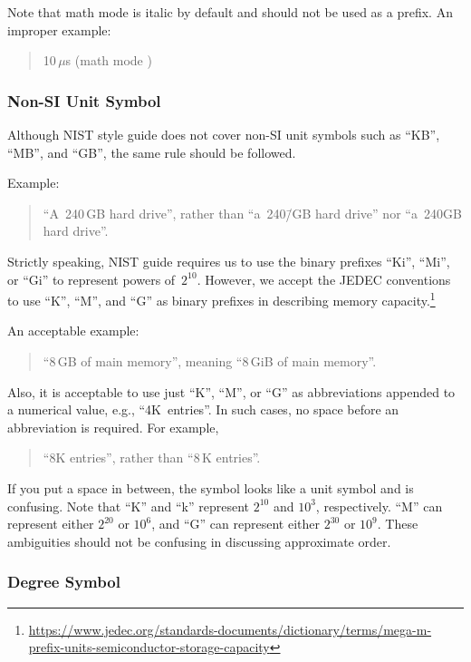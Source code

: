 Note that math mode \qco{\\mu} is italic by default and should not
be used as a prefix. An improper example:
\begin{quote}
  10\,$\mu $s (math mode \qco{\\mu})
\end{quote}

\subsubsection{Non-SI Unit Symbol}
\label{sec:app:styleguide:Non-SI Unit Symbol}

Although NIST style guide does not cover non-SI unit symbols
such as ``KB'', ``MB'', and ``GB'', the same rule should be followed.

Example:

\begin{quote}
  ``A~240\,GB hard drive'', rather than ``a~240\=/GB hard drive''
  nor ``a~240GB hard drive''.
\end{quote}

Strictly speaking, NIST guide requires us to use the binary prefixes
``Ki'', ``Mi'', or ``Gi'' to represent powers of~$2^{10}$.
However, we accept the JEDEC conventions to use ``K'', ``M'',
and ``G'' as binary prefixes in describing memory capacity.\footnote{
  \url{https://www.jedec.org/standards-documents/dictionary/terms/mega-m-prefix-units-semiconductor-storage-capacity}}

An acceptable example:
\begin{quote}
  ``8\,GB of main memory'', meaning ``8\,GiB of main memory''.
\end{quote}

Also, it is acceptable to use just ``K'', ``M'', or ``G'' as abbreviations
appended to a numerical value, e.g., ``4K~entries''. In such cases, no space
before an abbreviation is required. For example,

\begin{quote}
  ``8K entries'', rather than ``8\,K entries''.
\end{quote}

If you put a space in between, the symbol looks like a unit symbol and
is confusing.
Note that ``K'' and ``k'' represent $2^{10}$ and $10^3$, respectively.
``M'' can represent either $2^{20}$ or $10^6$, and ``G'' can represent
either $2^{30}$ or $10^9$. These ambiguities should not be confusing
in discussing approximate order.

\subsubsection{Degree Symbol}
\label{sec:app:styleguide:Degree Symbol}

